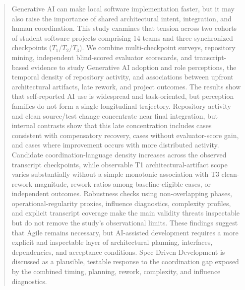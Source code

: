 \begin{abstract}
Generative AI can make local software implementation faster, but it may also
raise the importance of shared architectural intent, integration, and human
coordination. This study examines that tension across two cohorts of student
software projects comprising 14 teams and three synchronized checkpoints
($T_1$/$T_2$/$T_3$). We combine multi-checkpoint surveys, repository mining,
independent blind-scored evaluator scorecards, and transcript-based evidence to
study Generative AI adoption and role perceptions, the temporal density of
repository activity, and associations between upfront architectural artifacts,
late rework, and project outcomes. The results show that self-reported AI use
is widespread and task-oriented, but perception families do not form a single
longitudinal trajectory. Repository activity and clean source/test change
concentrate near final integration, but internal contrasts show that this late
concentration includes cases consistent with compensatory recovery, cases
without evaluator-score gain, and cases where improvement occurs with more
distributed activity. Candidate coordination-language density increases across
the observed transcript checkpoints, while observable T1 architectural-artifact
scope varies substantially without a simple monotonic association with T3
clean-rework magnitude, rework ratios among baseline-eligible cases, or
independent outcomes. Robustness checks using non-overlapping phases,
operational-regularity proxies, influence diagnostics, complexity profiles, and
explicit transcript coverage make the main validity threats inspectable but do
not remove the study's observational limits. These findings suggest that Agile
remains necessary, but AI-assisted development requires a more explicit and
inspectable layer of architectural planning, interfaces, dependencies, and
acceptance conditions. Spec-Driven Development is discussed as a plausible,
testable response to the coordination gap exposed by the combined timing,
planning, rework, complexity, and influence diagnostics.
\end{abstract}
